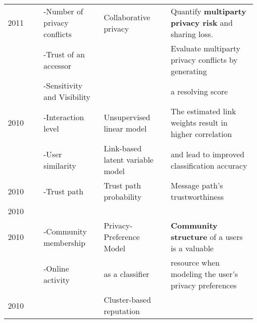 \begin{longtable}{lllll}
	2011  & \cite{hu_detecting_2011}                       & -Number of privacy conflicts     & Collaborative privacy            & Quantify \textbf{multiparty privacy risk} and sharing loss.   \\
	\     & \                                              & -Trust of an accessor            &                                  & Evaluate multiparty privacy conflicts by generating           \\
	\     & \                                              & -Sensitivity and Visibility      &                                  & a resolving score                                             \\\hline
	2010  & \cite{xiang_modeling_2010}                     & -Interaction level               & Unsupervised linear model        & The estimated link weights result in higher correlation       \\
	\     &                                                & -User similarity                 & Link-based latent variable model & and lead to improved classification accuracy                  \\\hline
	2010  & \cite{tran_social_2010}                        & -Trust path                      & Trust path probability           & Message path’s trustworthiness                                \\\hline
	2010  & \cite{talukder_privometer_2010}                &                                  &                                  &                                                               \\\hline
	2010  & \cite{fang_privacy_2010}                       & -Community membership            & Privacy-Preference Model         & \textbf{Community structure} of a users is a valuable         \\
	\     &                                                & -Online activity                 & as a classifier                  & resource when modeling the user’s privacy preferences         \\\hline
	2010  & \cite{qian_networklevel_2010}                  &                                  & Cluster-based reputation         &                                                               \\\hline

\end{longtable}
